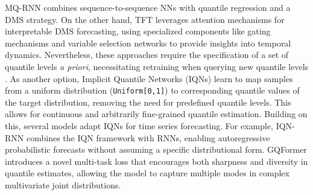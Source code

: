 \documentclass[a4paper,oneside,bibliography=totoc]{scrbook}
\begin{document}
MQ-RNN combines sequence-to-sequence NNs with quantile regression and a DMS strategy.
On the other hand, TFT leverages attention mechanisms for interpretable DMS forecasting, using specialized components like gating mechanisms and variable selection networks to provide insights into temporal dynamics. %
Nevertheless, these approaches require the specification of a set of quantile levels \textit{a priori}, necessitating retraining when querying new quantile levels \cite{park_learning_2022}. %
As another option, Implicit Quantile Networks (IQNs) \cite{dabney_implicit_2018} learn to map samples from a uniform distribution (\texttt{Uniform[0,1]}) to corresponding quantile values of the target distribution,
removing the need for predefined quantile levels. 
This allows for continuous and arbitrarily fine-grained quantile estimation. 
Building on this, several models adapt IQNs for time series forecasting.
For example, IQN-RNN \cite{gouttes_probabilistic_2021} combines the IQN framework with RNNs, enabling autoregressive probabilistic forecasts without assuming a specific distributional form.
GQFormer \cite{jawed_gqformer_2022} introduces a novel multi-task loss that encourages both sharpness and diversity in quantile estimates, allowing the model to capture multiple modes in complex multivariate joint distributions.
\end{document}
